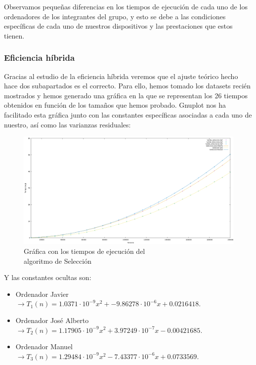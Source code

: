 \documentclass[10pt,a4paper]{article}
\begin{document}
Observamos pequeñas diferencias en los tiempos de ejecución de cada uno de los ordenadores de los integrantes del grupo, y esto se debe a las condiciones específicas de cada uno de nuestros dispositivos y las prestaciones que estos tienen.

\subsubsection{Eficiencia híbrida}

Gracias al estudio de la eficiencia híbrida veremos que el ajuste teórico hecho hace dos subapartados es el correcto. Para ello, hemos tomado los datasets recién mostrados y hemos generado una gráfica en la que se representan los 26 tiempos obtenidos en función de los tamaños que hemos probado. Gnuplot nos ha facilitado esta gráfica junto con las constantes específicas asociadas a cada uno de nuestro, así como las varianzas residuales:

\begin{figure}[h!]
	\centering
	\includegraphics[scale=0.15]{../../Images/Seleccion_combinados.png}
	\caption{Gráfica con los tiempos de ejecución del \\algoritmo de Selección}
\end{figure}

Y las constantes ocultas son:
\begin{itemize}
	\item Ordenador Javier \(\rightarrow T_1(n) = 1.0371 \cdot 10^{-9} x^2 + -9.86278 \cdot 10^{-6} x +0.0216418\).
	\item Ordenador José Alberto \(\rightarrow T_2(n) = 1.17905 \cdot 10^{-9} x^2 + 3.97249 \cdot 10^{-7} x - 0.00421685\).
	\item Ordenador Manuel \(\rightarrow T_3(n) = 1.29484 \cdot 10^{-9} x^2 - 7.43377 \cdot 10^{-6} x + 0.0733569\).
\end{itemize}
\end{document}
